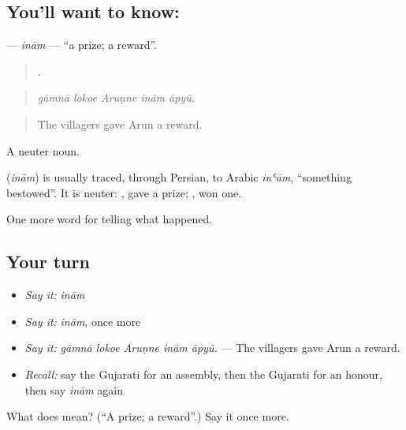 \subsection*{You'll want to know: }
\textbf{} — \emph{inām} — \textquotedblleft{}a prize; a reward\textquotedblright{}.

\begin{quote}
    .
\end{quote}

\begin{quote}
\emph{gāmnā lokoe Aruṇne inām āpyũ.}
\end{quote}

\begin{quote}
The villagers gave Arun a reward.
\end{quote}

A neuter noun.

\begin{cousinweb}
\textbf{} (\emph{inām}) is usually traced, through Persian, to Arabic \emph{inʿām}, \textquotedblleft{}something bestowed\textquotedblright{}. It is neuter: \textbf{ }, gave a prize; \textbf{ }, won one.
\end{cousinweb}

\begin{grammarlens}[title={What you've built}]
One more word for telling what happened.
\end{grammarlens}

\subsection*{Your turn}
\begin{itemize}
\raggedright
  \item \emph{Say it:} \emph{inām}
  \item \emph{Say it:} \emph{inām}, once more
  \item \emph{Say it:} \emph{gāmnā lokoe Aruṇne inām āpyũ.} — The villagers gave Arun a reward.
  \item \emph{Recall:} say the Gujarati for an assembly, then the Gujarati for an honour, then say \emph{inām} again
\end{itemize}

\begin{tcolorbox}[breakable,colback=teal!4,colframe=teal!35!black,title={Before you move on}]
What does  mean? (\textquotedblleft{}A prize; a reward\textquotedblright{}.) Say it once more.
\end{tcolorbox}
